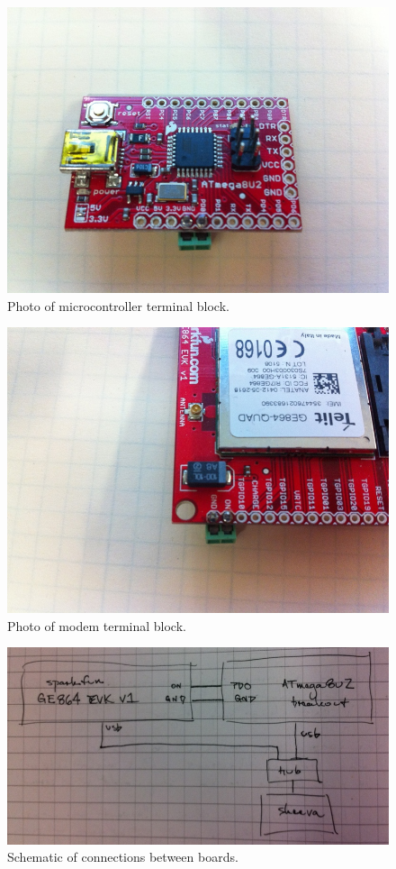 \documentclass{article}
\begin{document}
\begin{figure}[]
\begin{center}
\includegraphics[width=\columnwidth]{microcontroller.jpg}
\end{center}
\caption{Photo of microcontroller terminal block.}
\label{microcontroller}
\end{figure}

\begin{figure}[]
\begin{center}
\includegraphics[width=\columnwidth]{modem_unit.jpg}
\end{center}
\caption{Photo of modem terminal block.}
\label{modem_unit}
\end{figure}

\begin{figure}[]
\begin{center}
\includegraphics[width=\columnwidth]{schematic.jpg}
\end{center}
\caption{Schematic of connections between boards.}
\label{schematic}
\end{figure}
\end{document}
